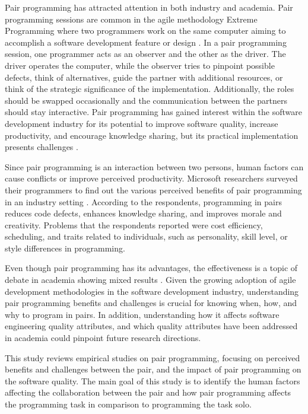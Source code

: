 \documentclass[conference]{IEEEtran}
\begin{document}
Pair programming has attracted attention in both industry and academia. Pair programming sessions are common in the agile methodology Extreme Programming where two programmers work on the same computer aiming to accomplish a software development feature or design \cite{10.5555/1076267}. In a pair programming session, one programmer acts as an observer and the other as the driver. The driver operates the computer, while the observer tries to pinpoint possible defects, think of alternatives, guide the partner with additional resources, or think of the strategic significance of the implementation. Additionally, the roles should be swapped occasionally and the communication between the partners should stay interactive. Pair programming has gained interest within the software development industry for its potential to improve software quality, increase productivity, and encourage knowledge sharing, but its practical implementation presents challenges \cite{10.1145/2652524.2652529, Williams2000Strengthening}.

Since pair programming is an interaction between two persons, human factors can cause conflicts or improve perceived productivity. Microsoft researchers surveyed their programmers to find out the various perceived benefits of pair programming in an industry setting \cite{10.1145/1414004.1414026}. According to the respondents, programming in pairs reduces code defects, enhances knowledge sharing, and improves morale and creativity. Problems that the respondents reported were cost efficiency, scheduling, and traits related to individuals, such as personality, skill level, or style differences in programming. 

Even though pair programming has its advantages, the effectiveness is a topic of debate in academia showing mixed results \cite{Hannay2009effectiveness}. Given the growing adoption of agile development methodologies in the software development industry, understanding pair programming benefits and challenges is crucial for knowing when, how, and why to program in pairs. In addition, understanding how it affects software engineering quality attributes, and which quality attributes have been addressed in academia could pinpoint future research directions.

This study reviews empirical studies on pair programming, focusing on perceived benefits and challenges between the pair, and the impact of pair programming on the software quality. The main goal of this study is to identify the human factors affecting the collaboration between the pair and how pair programming affects the programming task in comparison to programming the task solo.
\end{document}
